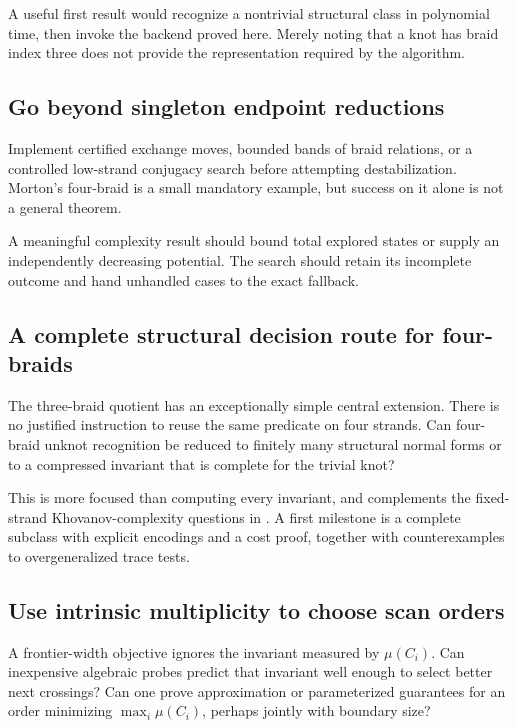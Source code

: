 \documentclass[11pt,letterpaper]{article}
\theoremstyle{definition}
\begin{document}
A useful first result would recognize a nontrivial structural class in
polynomial time, then invoke the backend proved here. Merely noting that
a knot has braid index three does not provide the representation required
by the algorithm.

\subsection{Go beyond singleton endpoint reductions}

Implement certified exchange moves, bounded bands of braid relations,
or a controlled low-strand conjugacy search before attempting
destabilization. Morton's four-braid is a small mandatory example, but
success on it alone is not a general theorem.

A meaningful complexity result should bound total explored states or
supply an independently decreasing potential. The search should retain
its incomplete outcome and hand unhandled cases to the exact fallback.

\subsection{A complete structural decision route for four-braids}

The three-braid quotient has an exceptionally simple central extension.
There is no justified instruction to reuse the same predicate on four
strands. Can four-braid unknot recognition be reduced to finitely many
structural normal forms or to a compressed invariant that is complete
for the trivial knot?

This is more focused than computing every invariant, and complements
the fixed-strand Khovanov-complexity questions in
\cite{kelomaki2026}. A first milestone is a complete subclass with
explicit encodings and a cost proof, together with counterexamples to
overgeneralized trace tests.

\subsection{Use intrinsic multiplicity to choose scan orders}

A frontier-width objective ignores the invariant measured by
\(\mu(C_i)\). Can inexpensive algebraic probes predict that invariant
well enough to select better next crossings? Can one prove approximation
or parameterized guarantees for an order minimizing
\(\max_i\mu(C_i)\), perhaps jointly with boundary size?
\end{document}
